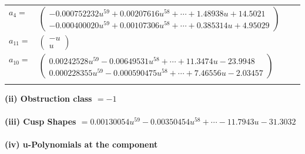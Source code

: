 \documentclass[1p]{elsarticle_modified}
\theoremstyle{definition}
\begin{document}
\begin{tabular}{m{7pt} m{180pt} m{7pt} m{180pt} }
\flushright $a_{4}=$&$\begin{pmatrix}-0.000752232 u^{59}+0.00207616 u^{58}+\cdots+1.48938 u+14.5021\\-0.000400020 u^{59}+0.00107306 u^{58}+\cdots+0.385314 u+4.95029\end{pmatrix}$ \\
\flushright $a_{11}=$&$\begin{pmatrix}- u\\u\end{pmatrix}$ \\
\flushright $a_{10}=$&$\begin{pmatrix}0.00242528 u^{59}-0.00649531 u^{58}+\cdots+11.3474 u-23.9948\\0.000228355 u^{59}-0.000590475 u^{58}+\cdots+7.46556 u-2.03457\end{pmatrix}$\\&\end{tabular}
\flushleft \textbf{(ii) Obstruction class $= -1$}\\~\\
\flushleft \textbf{(iii) Cusp Shapes $= 0.00130054 u^{59}-0.00350454 u^{58}+\cdots-11.7943 u-31.3032$}\\~\\
\newpage\renewcommand{\arraystretch}{1}
\flushleft \textbf{(iv) u-Polynomials at the component}\newline \\
\end{document}
